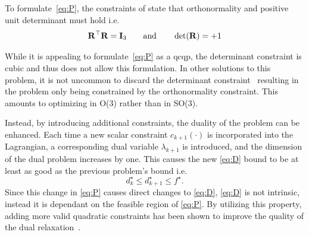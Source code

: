 To formulate~\ref{eq:P}, the constraints of  state that orthonormality and positive unit determinant must hold i.e.
%
\begin{equation}
	\bm{\mathrm{R}}^\top\bm{\mathrm{R}} = \bm{\mathrm{I}}_3 \qquad \text{and} \qquad \det(\bm{\mathrm{R}})=+1
\end{equation}

While it is appealing to formulate~\ref{eq:P} as a \gls{qcqp}, the determinant constraint is cubic and thus does not allow this formulation. In other solutions to this problem, it is not uncommon to discard the determinant constraint~\cite{lagrangian-duality-in-3d-slam:-verification-techniques-and-optimal-solutions,planar-pose-graph-optimization:-duality-optimal-solutions-and-verification} resulting in the problem only being constrained by the orthonormality constraint. This amounts to optimizing in O(3) rather than in SO(3). \medskip

Instead, by introducing additional constraints, the duality of the problem can be enhanced. Each time a new scalar constraint $c_{k+1}(\cdot)$ is incorporated into the Lagrangian, a corresponding dual variable $\lambda_{k+1}$ is introduced, and the dimension of the dual problem increases by one. This causes the new \ref{eq:D} bound  to be at least as good as the previous problem's bound i.e.
%
\begin{equation}
	d^\star_{k} \le d^\star_{k+1} \le f^\star.
\end{equation}
Since this change in \ref{eq:P} causes direct changes to \ref{eq:D}, \ref{eq:D} is not intrinsic, instead it is dependant on the feasible region of \ref{eq:P}. By utilizing this property, adding more valid quadratic constraints has been shown to improve the quality of the dual relaxation~\cite[Chapter 13]{semidefinite-programming-relaxations-of-nonconvex-quadratic-optimization}. \medskip

